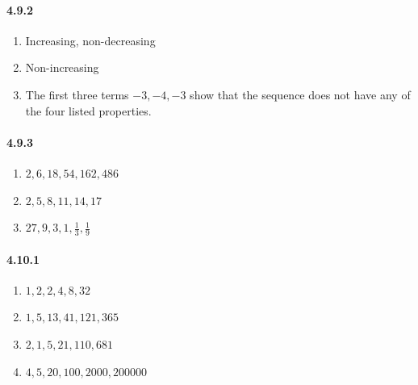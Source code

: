 \documentclass[11pt, letterpaper, twocolumn, fleqn]{article}
\begin{document}
    \paragraph{4.9.2}
        \begin{enumerate}
            \item Increasing, non-decreasing
            \item Non-increasing
            \item The first three terms $-3,-4,-3$ show that the sequence does not have any of the four listed properties.
        \end{enumerate}
    
    \paragraph{4.9.3}
        \begin{enumerate}
            \item $2,6,18,54,162,486$
            \item $2,5,8,11,14,17$
            \item $27,9,3,1,\frac{1}{3},\frac{1}{9}$
        \end{enumerate}
    
    \paragraph{4.10.1}
        \begin{enumerate}
            \item $1,2,2,4,8,32$
            \item $1,5,13,41,121,365$
            \item $2,1,5,21,110,681$
            \item $4,5,20,100,2000,200000$
        \end{enumerate}
    
\end{document}
